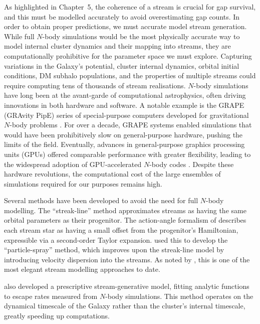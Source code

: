         As highlighted in Chapter~5, the coherence of a stream is crucial for gap survival, and this must be modelled accurately to avoid overestimating gap counts. In order to obtain proper predictions, we must accurate model stream generation. While full $N$-body simulations would be the most physically accurate way to model internal cluster dynamics and their mapping into streams, they are computationally prohibitive for the parameter space we must explore. Capturing variations in the Galaxy's potential, cluster internal dynamics, orbital initial conditions, DM subhalo populations, and the properties of multiple streams could require computing tens of thousands of stream realisations. $N$-body simulations have long been at the avant-garde of computational astrophysics, often driving innovations in both hardware and software. A notable example is the GRAPE (GRAvity PipE) series of special-purpose computers developed for gravitational $N$-body problems \citep{1991PASJ...43..841F,1997ApJ...480..432M}. For over a decade, GRAPE systems enabled simulations that would have been prohibitively slow on general-purpose hardware, pushing the limits of the field. Eventually, advances in general-purpose graphics processing units (GPUs) offered comparable performance with greater flexibility, leading to the widespread adoption of GPU-accelerated $N$-body codes \citep{2012MNRAS.424..545N,2015MNRAS.450.4070W}. Despite these hardware revolutions, the computational cost of the large ensembles of simulations required for our purposes remains high.

        Several methods have been developed to avoid the need for full $N$-body modelling. The ``streak-line'' method \citep{2012MNRAS.420.2700K} approximates streams as having the same orbital parameters as their progenitor. The action-angle formalism of \citet{2011MNRAS.413.1852E} describes each stream star as having a small offset from the progenitor's Hamiltonian, expressible via a second-order Taylor expansion. \citet{2014ApJ...795...95B} used this to develop the ``particle-spray'' method, which improves upon the streak-line model by introducing velocity dispersion into the streams. As noted by \citet{2015MNRAS.452..301F}, this is one of the most elegant stream modelling approaches to date.

        \citet{2015MNRAS.452..301F} also developed a prescriptive stream-generative model, fitting analytic functions to escape rates measured from $N$-body simulations. This method operates on the dynamical timescale of the Galaxy rather than the cluster's internal timescale, greatly speeding up computations.  

